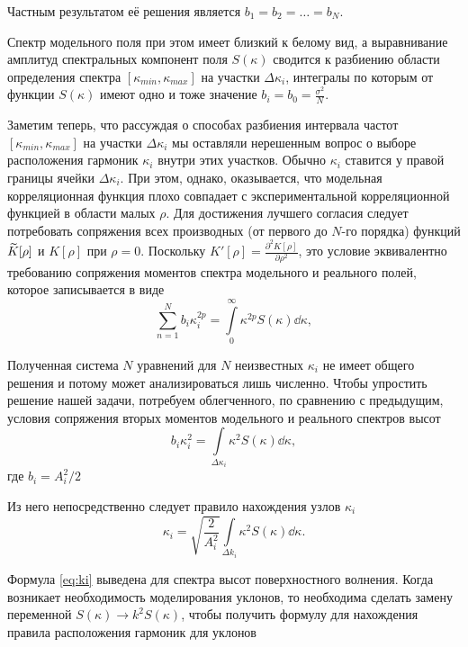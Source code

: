 Частным результатом её решения является $b_1 = b_2 = \dots = b_N$.

Спектр модельного поля при этом имеет близкий к белому вид, а выравнивание
амплитуд спектральных компонент поля $S(\kappa)$ сводится к разбиению области
определения спектра $[\kappa_{min},\kappa_{max}]$ на участки $\Delta
\kappa_i$, интегралы по
которым от функции  $S(\kappa)$ имеют одно и тоже значение $b_i = b_{0} =
\frac{\sigma^2}{N}$.

Заметим теперь, что рассуждая о способах разбиения интервала частот
$[\kappa_{min},
\kappa_{max}]$ на участки $\Delta \kappa_i$ мы оставляли нерешенным вопрос о выборе
расположения гармоник $\kappa_i$ внутри этих участков. Обычно  $\kappa_i$ ставится у
правой границы ячейки  $\Delta \kappa_i$. При этом, однако, оказывается, что
модельная корреляционная функция плохо совпадает с экспериментальной
корреляционной функцией в области малых  $\rho$. Для достижения лучшего
согласия следует потребовать сопряжения всех производных (от первого до $N$-го
порядка) функций $\widetilde K[\rho]$ и  $K[\rho]$ при  $\rho=0$. 
Поскольку $K'[\rho] = \frac{\partial^2 K[\rho]}{\partial \rho^2}$, это условие эквивалентно
требованию сопряжения моментов спектра модельного и реального полей, которое
записывается в виде
 \begin{equation}
    \sum\limits_{n=1}^{N} b_i \kappa_i^{2p} 
    = \int\limits_{0}^{\infty} \kappa^{2p}S(\kappa) \dd \kappa, 
\end{equation}

Полученная система $N$ уравнений для $N$ неизвестных $\kappa_i$ не имеет общего
решения и потому может анализироваться лишь численно. Чтобы упростить решение
нашей задачи, потребуем облегченного, по сравнению с предыдущим, условия
сопряжения вторых моментов модельного и реального спектров высот
 \begin{equation}
    b_i \kappa_i^2 = \int\limits_{\Delta \kappa_i} \kappa^2 S(\kappa) \dd \kappa,
\end{equation}
где $b_i= A_i^2 / 2$

Из него непосредственно следует правило нахождения узлов $\kappa_i$ 
\begin{equation}
    \label{eq:ki}
    \boxed{
        \kappa_i = \sqrt{\frac{2}{A_{i}^2}} \int\limits_{\Delta k_i} \kappa^2
        S(\kappa) \dd \kappa. 
    }
\end{equation}

Формула \eqref{eq:ki} выведена для спектра высот поверхностного волнения. Когда
возникает необходимость моделирования уклонов, то необходима сделать замену
переменной $S(\kappa) \to k^2 S(\kappa)$, чтобы получить формулу для нахождения правила
расположения гармоник для уклонов

